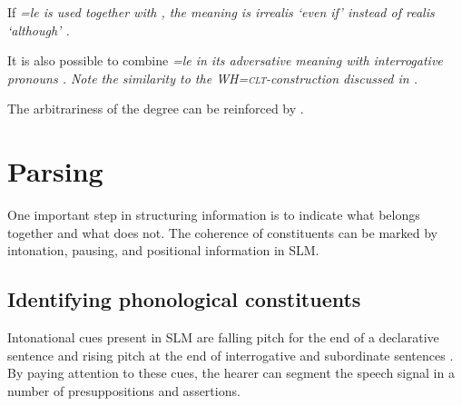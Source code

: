 If \em =le \em is used together with , the meaning is irrealis `even if' instead of realis `although' .


It is also possible to combine \em =le \em in its adversative meaning with interrogative pronouns . Note the similarity to the \textsc{WH=clt}-construction discussed in .


The arbitrariness of the degree can be reinforced by  .

 
\section{Parsing}\label{sec:disc:Parsing}
One important step in structuring information is to indicate what belongs together and what does not. The coherence of constituents can be marked by intonation, pausing, and positional information in SLM.

\subsection[Phonological constituents]{Identifying phonological constituents}\label{sec:disc:Identifyingphonologicalconstituents}
Intonational cues present in SLM are falling pitch for the end of a declarative sentence and rising pitch at the end of interrogative and subordinate sentences . By paying attention to these cues, the hearer can segment the speech signal in a number of presuppositions and assertions.

